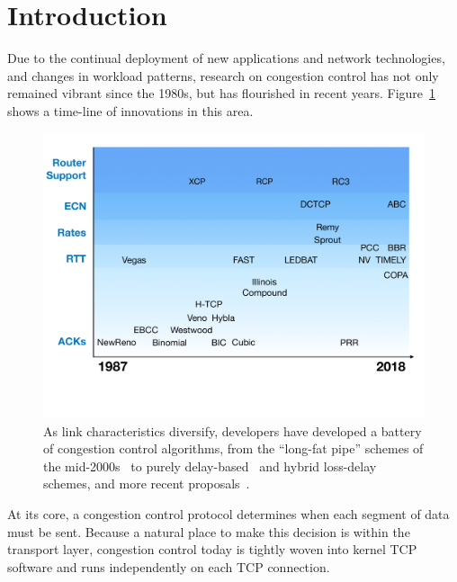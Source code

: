 \section{Introduction}

Due to the continual deployment of new applications and network technologies, and changes in workload patterns, research on congestion control has not only remained vibrant since the 1980s, but has flourished in recent years. Figure~\ref{fig:cctimeline} shows a time-line of innovations in this area.

\begin{figure}[t]
\centering
    \includegraphics[width=\columnwidth]{img/cc-timeline}
    \vspace{-1cm}
    \caption{As link characteristics diversify, developers have developed a battery of congestion control algorithms, from the ``long-fat pipe'' schemes of the mid-2000s~\cite{westwood, veno, htcp, hybla} to purely delay-based~\cite{vegas, fasttcp, ledbat, nv, timely} and hybrid loss-delay~\cite{illinois, compound} schemes, and more recent proposals~\cite{pcc, remy, sprout, bbr, copa, abc}.}\label{fig:cctimeline}
\end{figure}

At its core, a congestion control protocol determines when each segment of data must be sent. Because a natural place to make this decision is within the transport layer, congestion control today is tightly woven into kernel TCP software and runs independently on each TCP connection.


